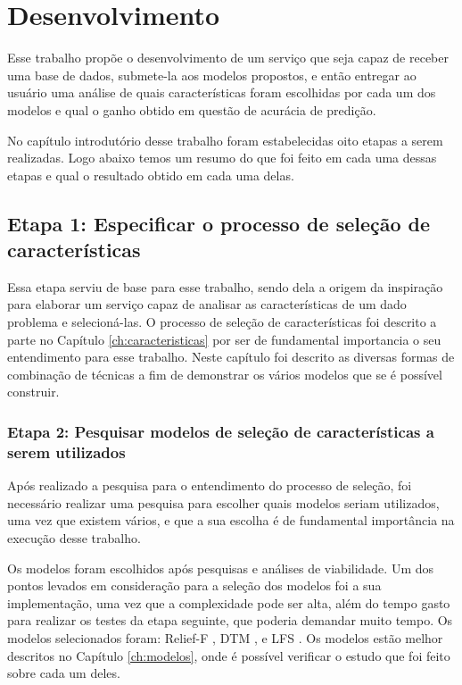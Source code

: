 \chapter[Desenvolvimento]{Desenvolvimento}

Esse trabalho propõe o desenvolvimento de um serviço que seja capaz de receber uma base de dados, submete-la aos modelos propostos, e então entregar ao usuário uma análise de quais características foram escolhidas por cada um dos modelos e qual o ganho obtido em questão de acurácia de predição.

No capítulo introdutório desse trabalho foram estabelecidas oito etapas a serem realizadas. Logo abaixo temos um resumo do que foi feito em cada uma dessas etapas e qual o resultado obtido em cada uma delas.

\section{Etapa 1: Especificar o processo de seleção de características}

Essa etapa serviu de base para esse trabalho, sendo dela a origem da inspiração para elaborar um serviço capaz de analisar as características de um dado problema e selecioná-las. O processo de seleção de características foi descrito a parte no Capítulo \ref{ch:caracteristicas} por ser de fundamental importancia o seu entendimento para esse trabalho. Neste capítulo foi descrito as diversas formas de combinação de técnicas a fim de demonstrar os vários modelos que se é possível construir.

\subsection{Etapa 2: Pesquisar modelos de seleção de características a serem utilizados}

Após realizado a pesquisa para o entendimento do processo de seleção, foi necessário realizar uma pesquisa para escolher quais modelos seriam utilizados, uma vez que existem vários, e que a sua escolha é de fundamental importância na execução desse trabalho. 

Os modelos foram escolhidos após pesquisas e análises de viabilidade. Um dos pontos levados em consideração para a seleção dos modelos foi a sua implementação, uma vez que a complexidade pode ser alta, além do tempo gasto para realizar os testes da etapa seguinte, que poderia demandar muito tempo. Os modelos selecionados foram: Relief-F \cite{dash_1997}, DTM \cite{dash_1997}, e LFS \cite{gutlein_2009}. Os modelos estão melhor descritos no Capítulo \ref{ch:modelos}, onde é possível verificar o estudo que foi feito sobre cada um deles.

